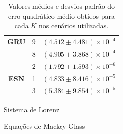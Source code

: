 \documentclass[a4paper, 12pt]{article}
\begin{document}
\begin{table}[!ht]
\begin{center}
\begin{subtable}{0.35\textwidth}
\begin{center}
{\begin{tabular}{c c c}
 \addlinespace
 {\centering \textbf{GRU}} & 9 & $(4.512 \pm 4.481) \times 10^{-4}$\\ 
 \addlinespace
 & 8 & $(4.905 \pm 3.868) \times 10^{-4}$\\
 \addlinespace
 \hline
 \addlinespace
 & 2 & $(1.792 \pm 1.593) \times 10^{-6}$\\
 \addlinespace
 {\centering \textbf{ESN}} & 1 & $(4.833 \pm 8.416) \times 10^{-5}$\\ 
 \addlinespace 
 & 3 & $(5.384 \pm 9.854) \times 10^{-5}$\\
 \bottomrule
\end{tabular}}
\caption{Sistema de Lorenz}
\label{tab:lorenz-eqm-3best}
\end{center}
\end{subtable}
\begin{subtable}{0.35\textwidth}
\begin{center}
\caption{Equações de Mackey-Glass}
\label{tab:mackeyglass-eqm-3best}
\end{center}
\end{subtable}
\caption{Valores médios e desvios-padrão do erro quadrático médio obtidos para cada $K$ nos cenários utilizadas.}
\label{tab:eqm-results-3best}
\end{center}
\end{table}
\end{document}
